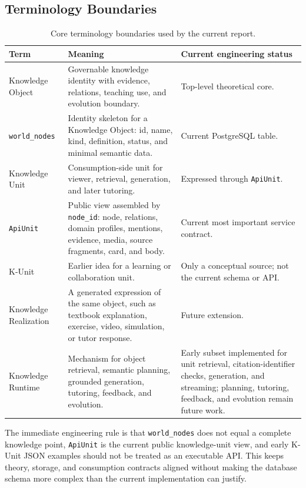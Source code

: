 \documentclass[11pt,letterpaper]{article}
\newcommand{\code}[1]{\nolinkurl{#1}}
\begin{document}
\subsection{Terminology Boundaries}

\begin{table}[H]
\centering
\small
\begin{tabularx}{\textwidth}{@{}lYY@{}}
\toprule
\textbf{Term} & \textbf{Meaning} & \textbf{Current engineering status}\\
\midrule
Knowledge Object & Governable knowledge identity with evidence, relations, teaching use, and evolution boundary. & Top-level theoretical core.\\
\code{world_nodes} & Identity skeleton for a Knowledge Object: id, name, kind, definition, status, and minimal semantic data. & Current PostgreSQL table.\\
Knowledge Unit & Consumption-side unit for viewer, retrieval, generation, and later tutoring. & Expressed through \code{ApiUnit}.\\
\code{ApiUnit} & Public view assembled by \code{node_id}: node, relations, domain profiles, mentions, evidence, media, source fragments, card, and body. & Current most important service contract.\\
K-Unit & Earlier idea for a learning or collaboration unit. & Only a conceptual source; not the current schema or API.\\
Knowledge Realization & A generated expression of the same object, such as textbook explanation, exercise, video, simulation, or tutor response. & Future extension.\\
Knowledge Runtime & Mechanism for object retrieval, semantic planning, grounded generation, tutoring, feedback, and evolution. & Early subset implemented for unit retrieval, citation-identifier checks, generation, and streaming; planning, tutoring, feedback, and evolution remain future work.\\
\bottomrule
\end{tabularx}
\caption{Core terminology boundaries used by the current report.}
\end{table}

The immediate engineering rule is that \code{world_nodes} does not equal a complete knowledge point, \code{ApiUnit} is the current public knowledge-unit view, and early K-Unit JSON examples should not be treated as an executable API. This keeps theory, storage, and consumption contracts aligned without making the database schema more complex than the current implementation can justify.
\end{document}
